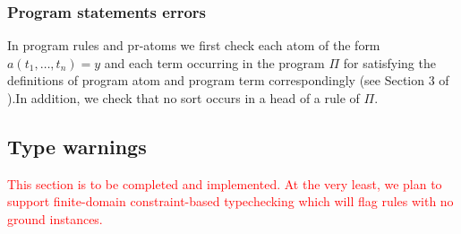 \documentclass[12pt, letterpaper]{article}
\begin{document}
\subsubsection{Program statements errors}

In program rules and pr-atoms we first check each atom of the form $a(t_1,\dots,t_n) = y$ and each term occurring in the program $\Pi$ for satisfying
the definitions of program atom and program term correspondingly (see Section 3 of \cite{Balai2019}).In addition, we check that no sort occurs in a head of a rule of $\Pi$.
\subsection{Type warnings}\label{type_warnings}
\textcolor{red}{This section is to be completed and implemented. At the very least, we plan to support finite-domain constraint-based typechecking which will flag rules with no ground instances.}



\end{document}
